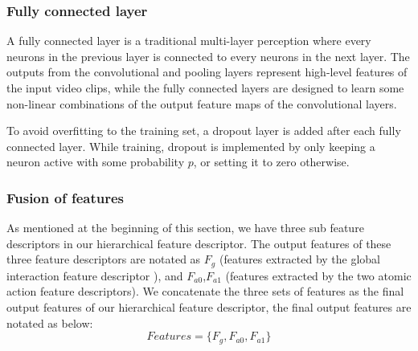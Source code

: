 \subsubsection*{Fully connected layer}
\label{fc}
A fully connected layer is a traditional multi-layer perception where every neurons in the previous layer is connected to every neurons in the next layer. The outputs from the convolutional and pooling layers represent high-level features of the input video clips, while the fully connected layers are designed to learn some non-linear combinations of the output feature maps of the convolutional layers.
\par
\label{dropout}
To avoid overfitting to the training set, a dropout layer \cite{dropout} is added after each fully connected layer. While training, dropout is implemented by only keeping a neuron active with some probability \(p\), or setting it to zero otherwise. 

\subsubsection*{Fusion of features}
As mentioned at the beginning of this section, we have three sub feature descriptors in our hierarchical feature descriptor. The output features of these three feature descriptors are notated as \(F_g\) (features extracted by the global interaction feature descriptor ), and \(F_{a0}\),\(F_{a1}\) (features extracted by the two atomic action feature descriptors).  We concatenate the three sets of features as the final output features of our hierarchical feature descriptor, the final output features are notated as below:
\begin{equation}
 	Features = \{F_{g}, F_{a0}, F_{a1}\}
\end{equation}  


